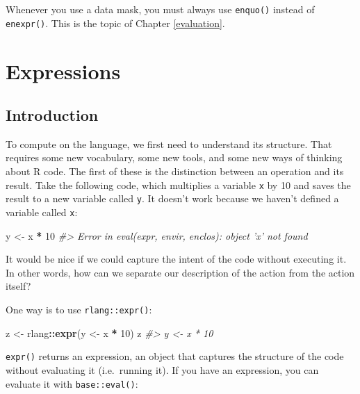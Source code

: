 \documentclass[]{book}
\newenvironment{Shaded}{\begin{snugshade}}{\end{snugshade}}
\newcommand{\CommentTok}[1]{\textcolor[rgb]{0.37,0.37,0.37}{\textit{#1}}}
\newcommand{\DecValTok}[1]{\textcolor[rgb]{0.06,0.06,0.06}{#1}}
\newcommand{\KeywordTok}[1]{\textcolor[rgb]{0.27,0.27,0.27}{\textbf{#1}}}
\newcommand{\NormalTok}[1]{#1}
\newcommand{\OperatorTok}[1]{\textcolor[rgb]{0.43,0.43,0.43}{\textbf{#1}}}
\newcommand{\StringTok}[1]{\textcolor[rgb]{0.5,0.5,0.5}{#1}}
\begin{document}
Whenever you use a data mask, you must always use \texttt{enquo()} instead of \texttt{enexpr()}. This is the topic of Chapter \ref{evaluation}.

\hypertarget{expressions}{%
\chapter{Expressions}\label{expressions}}

\hypertarget{introduction-2}{%
\section{Introduction}\label{introduction-2}}


To compute on the language, we first need to understand its structure. That requires some new vocabulary, some new tools, and some new ways of thinking about R code. The first of these is the distinction between an operation and its result. Take the following code, which multiplies a variable \texttt{x} by 10 and saves the result to a new variable called \texttt{y}. It doesn't work because we haven't defined a variable called \texttt{x}:

\begin{Shaded}
\begin{Highlighting}[]
\NormalTok{y <-}\StringTok{ }\NormalTok{x }\OperatorTok{*}\StringTok{ }\DecValTok{10}
\CommentTok{#> Error in eval(expr, envir, enclos): object 'x' not found}
\end{Highlighting}
\end{Shaded}

It would be nice if we could capture the intent of the code without executing it. In other words, how can we separate our description of the action from the action itself?

One way is to use \texttt{rlang::expr()}:

\begin{Shaded}
\begin{Highlighting}[]
\NormalTok{z <-}\StringTok{ }\NormalTok{rlang}\OperatorTok{::}\KeywordTok{expr}\NormalTok{(y <-}\StringTok{ }\NormalTok{x }\OperatorTok{*}\StringTok{ }\DecValTok{10}\NormalTok{)}
\NormalTok{z}
\CommentTok{#> y <- x * 10}
\end{Highlighting}
\end{Shaded}

\texttt{expr()} returns an expression, an object that captures the structure of the code without evaluating it (i.e.~running it). If you have an expression, you can evaluate it with \texttt{base::eval()}:
\end{document}
